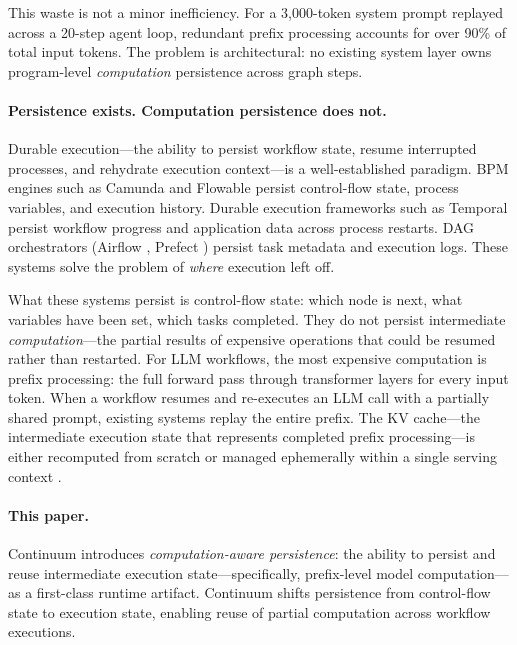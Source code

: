 \documentclass[10pt,twocolumn]{article}
\begin{document}
This waste is not a minor inefficiency. For a 3,000-token system prompt replayed across a 20-step agent loop, redundant prefix processing accounts for over 90\% of total input tokens. The problem is architectural: no existing system layer owns program-level \emph{computation} persistence across graph steps.

\paragraph{Persistence exists. Computation persistence does not.}
Durable execution---the ability to persist workflow state, resume interrupted processes, and rehydrate execution context---is a well-established paradigm. BPM engines such as Camunda \cite{camunda2024docs} and Flowable \cite{flowable2024docs} persist control-flow state, process variables, and execution history. Durable execution frameworks such as Temporal \cite{temporal2024docs} persist workflow progress and application data across process restarts. DAG orchestrators (Airflow \cite{apache2024airflow}, Prefect \cite{prefect2024docs}) persist task metadata and execution logs. These systems solve the problem of \emph{where} execution left off.

What these systems persist is control-flow state: which node is next, what variables have been set, which tasks completed. They do not persist intermediate \emph{computation}---the partial results of expensive operations that could be resumed rather than restarted. For LLM workflows, the most expensive computation is prefix processing: the full forward pass through transformer layers for every input token. When a workflow resumes and re-executes an LLM call with a partially shared prompt, existing systems replay the entire prefix. The KV cache---the intermediate execution state that represents completed prefix processing---is either recomputed from scratch or managed ephemerally within a single serving context \cite{kwon2023pagedattention,zheng2024sglang}.

\paragraph{This paper.}
Continuum introduces \emph{computation-aware persistence}: the ability to persist and reuse intermediate execution state---specifically, prefix-level model computation---as a first-class runtime artifact. Continuum shifts persistence from control-flow state to execution state, enabling reuse of partial computation across workflow executions.
\end{document}
